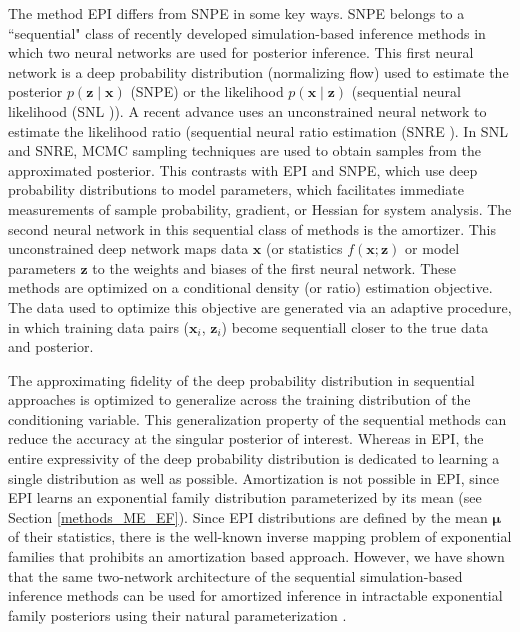 \documentclass[11pt]{article}
\begin{document}
The method EPI differs from SNPE in some key ways.
SNPE belongs to a ``sequential" class of recently developed simulation-based inference methods in which two neural networks are used for posterior inference.
This first neural network is a deep probability distribution (normalizing flow) used to estimate the posterior $p(\mathbf{z} \mid \mathbf{x})$ (SNPE) or the likelihood  $p(\mathbf{x} \mid \mathbf{z})$ (sequential neural likelihood (SNL \cite{papamakarios2019sequential})).
A recent advance uses an unconstrained neural network to estimate the likelihood ratio (sequential neural ratio estimation (SNRE \cite{hermans2020likelihood}).
In SNL and SNRE, MCMC sampling techniques are used to obtain samples from the approximated posterior.
This contrasts with EPI and SNPE, which use deep probability distributions to model parameters, which facilitates immediate measurements of sample probability, gradient, or Hessian for system analysis.
The second neural network in this sequential class of methods is the amortizer.  This unconstrained deep network maps data $\mathbf{x}$ (or statistics $f(\mathbf{x}; \mathbf{z})$ or model parameters $\mathbf{z}$ to the weights and biases of the first neural network.
These methods are optimized on a conditional density (or ratio) estimation objective.
The data used to optimize this objective are generated via an adaptive procedure, in which training data pairs ($\mathbf{x}_i$, $\mathbf{z}_i$) become sequentiall closer to the true data and posterior.

The approximating fidelity of the deep probability distribution in sequential approaches is optimized to generalize across the training distribution of the conditioning variable.
This generalization property of the sequential methods can reduce the accuracy at the singular posterior of interest.
Whereas in EPI, the entire expressivity of the deep probability distribution is dedicated to learning a single distribution as well as possible.
Amortization is not possible in EPI, since EPI learns an exponential family distribution parameterized by its mean (see Section \ref{methods_ME_EF}).
Since EPI distributions are defined by the mean $\bm{\mu}$ of their statistics, there is the well-known inverse mapping problem of exponential families \cite{wainwright2008graphical} that prohibits an amortization based approach.
However, we have shown that the same two-network architecture of the sequential simulation-based inference methods can be used for amortized inference in intractable exponential family posteriors using their natural parameterization \cite{bittner2019approximating}.
\end{document}
